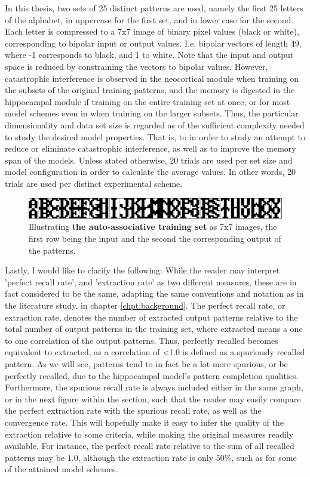 In this thesis, two sets of 25 distinct patterns are used, namely the first 25 letters of the alphabet, in uppercase for the first set, and in lower case for the second. Each letter is compressed to a 7x7 image of binary pixel values (black or white), corresponding to bipolar input or output values. I.e. bipolar vectors of length 49, where -1 corresponds to black, and 1 to white. Note that the input and output space is reduced by constraining the vectors to bipolar values. However, catastrophic interference is observed in the neocortical module when training on the subsets of the original training patterns, and the memory is digested in the hippocampal module if training on the entire training set at once, or for most model schemes even in when training on the larger subsets. Thus, the particular dimensionality and data set size is regarded as of the sufficient complexity needed to study the desired model properties. That is, to in order to study an attempt to reduce or eliminate catastrophic interference, as well as to improve the memory span of the models.
Unless stated otherwise, 20 trials are used per set size and model configuration in order to calculate the average values. In other words, 20 trials are used per distinct experimental scheme.

\begin{figure}\label{fig:sample_letters}
    \centering
    \includegraphics[width=12cm]{fig/im_both.png}
    \caption{Illustrating \textbf{the auto-associative training set} as 7x7 images, the first row being the input and the second the corresponding output of the patterns.}
\end{figure}

Lastly, I would like to clarify the following: While the reader may interpret 'perfect recall rate', and 'extraction rate' as two different measures, these are in fact considered to be the same, adapting the same conventions and notation as in the literature study, in chapter \ref{chpt:background}. The perfect recall rate, or extraction rate, denotes the number of extracted output patterns relative to the total number of output patterns in the training set, where extracted means a one to one correlation of the output patterns. Thus, perfectly recalled becomes equivalent to extracted, as a correlation of <1.0 is defined as a spuriously recalled pattern. As we will see, patterns tend to in fact be a lot more spurious, or be perfectly recalled, due to the hippocampal model's pattern completion qualities.
Furthermore, the spurious recall rate is always included either in the same graph, or in the next figure within the section, such that the reader may easily compare the perfect extraction rate with the spurious recall rate, as well as the convergence rate. This will hopefully make it easy to infer the quality of the extraction relative to some criteria, while making the original measures readily available. For instance, the perfect recall rate relative to the sum of all recalled patterns may be $1.0$, although the extraction rate is only $50 \%$, such as for some of the attained model schemes.

